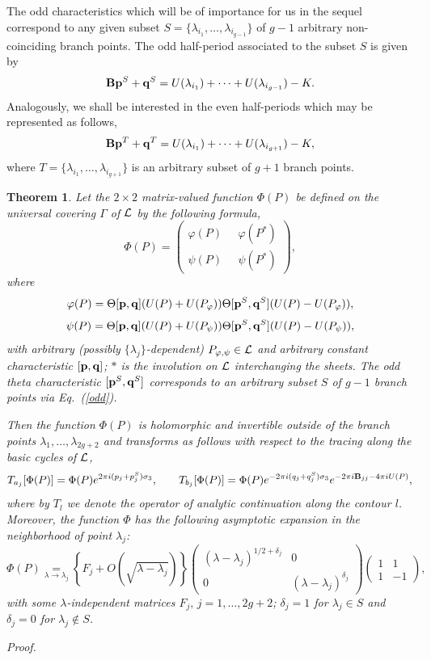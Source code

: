 \documentclass[11pt]{article}
\def\underset#1#2{\mathrel{\mathop{#2}\limits_{#1}}}
\newtheorem{theorem}{Theorem}[section]
\def\be{\begin{equation}}
\def\ee{\end{equation}}
\def\ba{\begin{array}}
\def\ea{\end{array}}
\def\l{\lambda}
\def\Th{\Theta}
\def\phi{\varphi}
\def\Lh{\Gamma}
\def\B{{\bf B}}
\def\la{\label}
\def\L{{\cal L}}
\def\pb{{\bf p}}
\def\qb{{\bf q}}
\def\0{S}
\begin{document}
The odd characteristics which will be of importance for us in the sequel correspond to any given subset $S=\{\l_{i_1},\dots,\l_{i_{g-1}}\}$ of $g-1$ arbitrary non-coinciding branch points. The odd half-period associated to the subset $S$ is given by  
\be
\B\pb^S+\qb^S= U(\l_{i_1})+\dots+U(\l_{i_{g-1}})-K.
\la{odd}
\ee
Analogously, we shall be interested in the even half-periods which may be represented as follows,
\be
\B\pb^T+\qb^T = U(\l_{i_1})+\dots+U(\l_{i_{g+1}})-K,
\la{even}\ee
where $T=\{\l_{i_1},\dots,\l_{i_{g+1}}\}$ is an arbitrary subset of $g+1$ branch points.
\begin{theorem}
Let the $2\times 2$ matrix-valued function $\Phi(P)$ be defined on the universal covering $\Lh$ of $\L$ by the following formula,
\be
\Phi(P)=\left(\ba{cc}\phi(P)\;\;\;\;\; \phi(P^*)\\
                  \psi(P)\;\;\;\;\; \psi(P^*)\ea\right),
\la{Psi0}\ee 
where 
\be
\phi(P)=\Th[\pb,\qb](U(P)+U(P_\phi))\Th[\pb^\0,\qb^\0](U(P)-U(P_\phi)),
\la{phi1}
\ee
\be
\psi(P)=\Th[\pb,\qb](U(P)+U(P_\psi))\Th[\pb^\0,\qb^\0](U(P)-U(P_\psi)),
\la{psi1}
\ee
with arbitrary (possibly $\{\l_j\}$-dependent) $P_{\phi,\psi}\in\L$ and arbitrary constant characteristic $[\pb,\qb]$; $*$ is the involution on $\L$ interchanging the sheets. The odd theta characteristic $[\pb^\0,\qb^\0]$ corresponds to an arbitrary subset $S$ of $g-1$ branch points via 
{\rm Eq.~(\ref{odd})}.

Then the function $\Phi(P)$ is holomorphic and invertible outside of the branch points $\l_1,\dots,\l_{2g+2}$ and transforms as follows with respect to the tracing along the  basic cycles of $\L$,
\be
T_{a_j}[\Phi(P)]= \Phi(P)e^{2\pi i (p_j+ p^\0_j)\sigma_3},  
\;\;\;\;\;\;\;
T_{b_j}[\Phi(P)]= \Phi(P)e^{-2\pi i (q_j+  q^\0_j)\sigma_3}
e^{-2\pi i\B_{jj}-4\pi i U(P)},
\la{transPsi}\ee
where by $T_l$ we denote the operator of analytic continuation along the contour $l$. 
Moreover, the function $\Phi$ has the following asymptotic expansion in the neighborhood of point $\l_j$:
\be
\Phi (P)\underset{\lambda\to\lambda_j}=\left\{ F_j+ 
O(\sqrt{\l-\l_j})\right\}\left(\ba{cc}(\l-\l_j)^{1/2+\delta_j}& 0\\
                                 0     & (\l-\l_j)^{\delta_j} \ea \right) 
\left(\ba{cc}1 & 1\\
            1  & -1 \ea \right),
\la{asPsi0}
\ee
with some $\l$-independent matrices $F_j,\,j=1,\dots,2g+2$; $\delta_j=1$ for $\l_j\in S$ and  $\delta_j=0$ for $\l_j\not\in S$.
\la{1}
\end{theorem}
{\it Proof.} 
\end{document}
